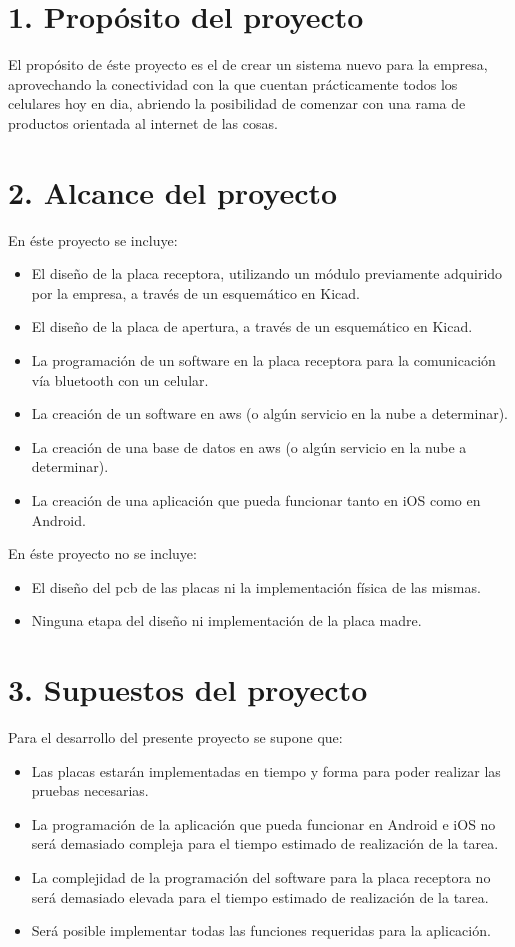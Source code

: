 \documentclass[11pt]{charter}
\begin{document}
\section{1. Propósito del proyecto}
\label{sec:proposito}


El propósito de éste proyecto es el de crear un sistema nuevo para la empresa, aprovechando la conectividad con la que cuentan prácticamente todos los celulares hoy en dia, abriendo la posibilidad de comenzar con una rama de productos orientada al internet de las cosas.


\section{2. Alcance del proyecto}
\label{sec:alcance}


En éste proyecto se incluye:
\begin{itemize}
\item El diseño de la placa receptora, utilizando un módulo previamente adquirido por la empresa, a través de un esquemático en Kicad.
\item El diseño de la placa de apertura, a través de un esquemático en Kicad.
\item La programación de un software en la placa receptora para la comunicación vía bluetooth con un celular.
\item La creación de un software en aws (o algún servicio en la nube a determinar).
\item La creación de una base de datos en aws (o algún servicio en la nube a determinar).
\item La creación de una aplicación que pueda funcionar tanto en iOS como en Android.
\end{itemize}
En éste proyecto no se incluye:
\begin{itemize}
\item El diseño del pcb de las placas ni la implementación física de las mismas.
\item Ninguna etapa del diseño ni implementación de la placa madre.
\end{itemize}


\section{3. Supuestos del proyecto}
\label{sec:supuestos}

Para el desarrollo del presente proyecto se supone que:

\begin{itemize}
\item Las placas estarán implementadas en tiempo y forma para poder realizar las pruebas necesarias.
\item La programación de la aplicación que pueda funcionar en Android e iOS no será demasiado compleja para el tiempo estimado de realización de la tarea.
\item La complejidad de la programación del software para la placa receptora no será demasiado elevada para el tiempo estimado de realización de la tarea.
\item Será posible implementar todas las funciones requeridas para la aplicación.
\end{itemize}
\end{document}
